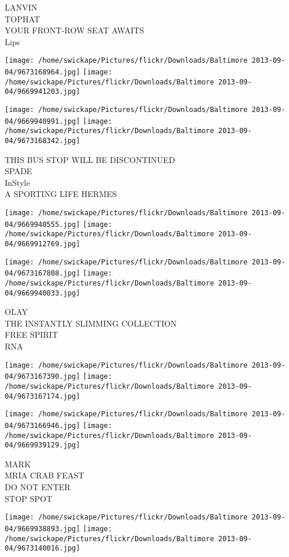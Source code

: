 \documentclass[10pt,letterpaper]{article}
\begin{document}
LANVIN\\
TOPHAT\\
YOUR FRONT{-}ROW SEAT AWAITS\\
Lips
\pagebreak

\texttt{[image: /home/swickape/Pictures/flickr/Downloads/Baltimore 2013-09-04/9673168964.jpg]}
\texttt{[image: /home/swickape/Pictures/flickr/Downloads/Baltimore 2013-09-04/9669941203.jpg]}

\texttt{[image: /home/swickape/Pictures/flickr/Downloads/Baltimore 2013-09-04/9669940991.jpg]}
\texttt{[image: /home/swickape/Pictures/flickr/Downloads/Baltimore 2013-09-04/9673168342.jpg]}

THIS BUS STOP WILL BE DISCONTINUED\\
SPADE\\
InStyle\\
A SPORTING LIFE HERMES
\pagebreak

\texttt{[image: /home/swickape/Pictures/flickr/Downloads/Baltimore 2013-09-04/9669940555.jpg]}
\texttt{[image: /home/swickape/Pictures/flickr/Downloads/Baltimore 2013-09-04/9669912769.jpg]}

\texttt{[image: /home/swickape/Pictures/flickr/Downloads/Baltimore 2013-09-04/9673167808.jpg]}
\texttt{[image: /home/swickape/Pictures/flickr/Downloads/Baltimore 2013-09-04/9669940033.jpg]}

OLAY\\
THE INSTANTLY SLIMMING COLLECTION\\
FREE SPIRIT\\
RNA
\pagebreak

\texttt{[image: /home/swickape/Pictures/flickr/Downloads/Baltimore 2013-09-04/9673167390.jpg]}
\texttt{[image: /home/swickape/Pictures/flickr/Downloads/Baltimore 2013-09-04/9673167174.jpg]}

\texttt{[image: /home/swickape/Pictures/flickr/Downloads/Baltimore 2013-09-04/9673166946.jpg]}
\texttt{[image: /home/swickape/Pictures/flickr/Downloads/Baltimore 2013-09-04/9669939129.jpg]}

MARK\\
MRIA CRAB FEAST\\
DO NOT ENTER\\
STOP SPOT
\pagebreak

\texttt{[image: /home/swickape/Pictures/flickr/Downloads/Baltimore 2013-09-04/9669938893.jpg]}
\texttt{[image: /home/swickape/Pictures/flickr/Downloads/Baltimore 2013-09-04/9673140016.jpg]}
\end{document}
